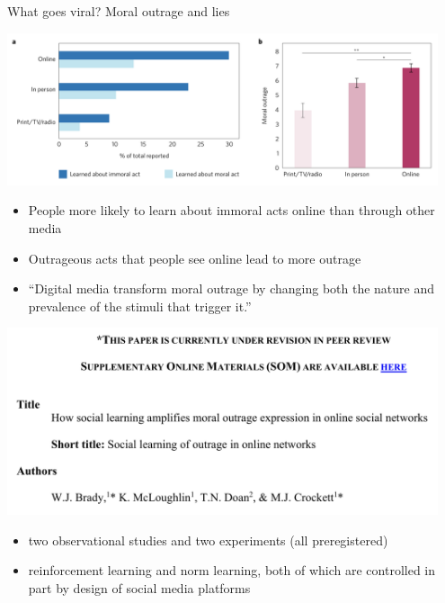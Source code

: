 \documentclass[aspectratio=169]{beamer}
\begin{document}
\begin{frame}

What goes viral? Moral outrage and lies

\end{frame}
\begin{frame}

\begin{center}
\includegraphics[width=0.95\textwidth]{figures/crockett_moral_2017_fig2}
\end{center}

\begin{itemize}
\item People more likely to learn about immoral acts online than through other media \pause
\item Outrageous acts that people see online lead to more outrage \pause
\item ``Digital media transform moral outrage by changing both the nature and prevalence of the stimuli that trigger it.''
\end{itemize}

\end{frame}
\begin{frame}

\begin{center}
\includegraphics[width=0.95\textwidth]{figures/brady_how_2021_title}
\end{center}

\begin{itemize}
\item two observational studies and two experiments (all preregistered) \pause
\item reinforcement learning and norm learning, both of which are controlled in part by design of social media platforms
\end{itemize}

\end{frame}
\end{document}
